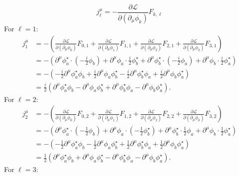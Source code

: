 \[ j^\mu_\ell = -\frac{\partial \mathcal L}{\partial ( \partial_\mu \phi_k)} F_{k,\ell} \]
For \(\ell = 1\):
   \[
   \begin{aligned}
   j^\mu_1 &= -\left( \frac{\partial \mathcal{L}}{\partial (\partial_\mu \phi_0)} F_{0,1} + \frac{\partial \mathcal{L}}{\partial (\partial_\mu \phi_1)} F_{1,1} + \frac{\partial \mathcal{L}}{\partial (\partial_\mu \phi_2)} F_{2,1} + \frac{\partial \mathcal{L}}{\partial (\partial_\mu \phi_3)} F_{3,1} \right) \\
   &= -\left( \partial^\mu \phi_a^\star \cdot \left( -\frac{i}{2} \phi_b \right) + \partial^\mu \phi_a \cdot \frac{i}{2} \phi_b^\star+ \partial^\mu \phi_b^\star \cdot \left( -\frac{i}{2} \phi_a \right) + \partial^\mu \phi_b \cdot \frac{i}{2} \phi_a^\star \right) \\
   &= -\left( -\frac{i}{2} \partial^\mu \phi_a^\star \phi_b + \frac{i}{2} \partial^\mu \phi_a \phi_b^\star - \frac{i}{2} \partial^\mu \phi_b^\star \phi_a + \frac{i}{2} \partial^\mu \phi_b \phi_a^\star \right) \\
   &= \frac{i}{2} \left( \partial^\mu \phi_a^\star \phi_b - \partial^\mu \phi_a \phi_b^\star + \partial^\mu \phi_b^\star \phi_a - \partial^\mu \phi_b \phi_a^\star \right).
   \end{aligned}
   \]
For \(\ell = 2\):
   \[
   \begin{aligned}
   j^\mu_2 &= -\left( \frac{\partial \mathcal{L}}{\partial (\partial_\mu \phi_0)} F_{0,2} + \frac{\partial \mathcal{L}}{\partial (\partial_\mu \phi_1)} F_{1,2} + \frac{\partial \mathcal{L}}{\partial (\partial_\mu \phi_2)} F_{2,2} + \frac{\partial \mathcal{L}}{\partial (\partial_\mu \phi_3)} F_{3,2} \right) \\
   &= -\left( \partial^\mu \phi_a^\star \cdot \left( -\frac{1}{2} \phi_b\right) + \partial^\mu \phi_a \cdot \left( -\frac{1}{2} \phi_b^\star \right) + \partial^\mu \phi_b^\star \cdot \frac{1}{2} \phi_a + \partial^\mu \phi_b \cdot \frac{1}{2} \phi_a^\star \right) \\
   &= -\left( -\frac{1}{2} \partial^\mu \phi_a^\star \phi_b - \frac{1}{2} \partial^\mu \phi_a \phi_b^\star + \frac{1}{2} \partial^\mu \phi_b^\star \phi_a + \frac{1}{2} \partial^\mu \phi_b \phi_a^\star \right) \\
   &= \frac{1}{2} \left( \partial^\mu \phi_a^\star \phi_b + \partial^\mu \phi_a \phi_b^\star - \partial^\mu \phi_b^\star \phi_a - \partial^\mu \phi_b \phi_a^\star \right).
   \end{aligned}
   \]
For \(\ell = 3\):
